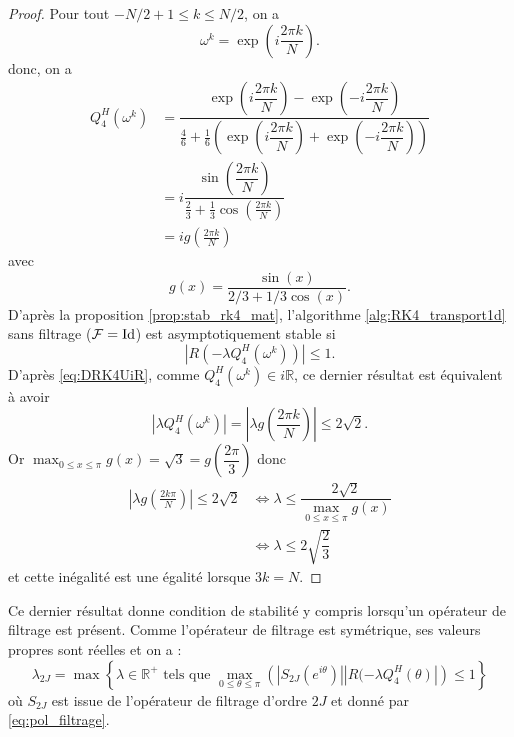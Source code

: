 \begin{proof}
Pour tout $-N/2 + 1 \leq k \leq N/2$, on a
\begin{equation}
\omega^k = \exp \left( i \dfrac{2 \pi k}{N} \right).
\end{equation}
donc, on a 
\begin{align*}
Q_4^H(\omega^k) & = \dfrac{\exp \left( i \dfrac{2 \pi k}{N} \right) - \exp \left(- i \dfrac{2 \pi k}{N} \right)}{\frac{4}{6} + \frac{1}{6} \left( \exp \left( i \dfrac{2 \pi k}{N} \right) + \exp \left( -i \dfrac{2 \pi k}{N} \right) \right)} \\
		& = i \dfrac{\sin \left( \dfrac{2 \pi k}{N} \right)}{\frac{2}{3} + \frac{1}{3} \cos \left( \frac{2 \pi k}{N} \right)}\\
		& = i g \left( \frac{2 \pi k}{N} \right)
\end{align*}
avec 
\begin{equation}
g(x) = \dfrac{\sin(x)}{2/3 + 1/3 \cos (x)}.
\end{equation}
D'après la proposition \ref{prop:stab_rk4_mat}, l'algorithme \ref{alg:RK4_transport1d} sans filtrage ($\mathcal{F} = \text{Id}$) est asymptotiquement stable si
\begin{equation}
| R(- \lambda Q_4^H(\omega^k))| \leq 1.
\end{equation}
D'après \eqref{eq:DRK4UiR}, comme $Q_4^H(\omega^k) \in i \mathbb{R}$, ce dernier résultat est équivalent à avoir 
\begin{equation}
|\lambda Q_4^H(\omega^k)| = |\lambda g \left( \frac{2\pi k}{N} \right)| \leq 2 \sqrt{2}.
\end{equation}
Or $\max_{0 \leq x \leq \pi} g(x) = \sqrt{3} = g \left(\dfrac{2 \pi}{3}\right)$ donc
\begin{align*}
| \lambda g \left( \frac{2 k \pi}{N} \right)| \leq 2 \sqrt{2} & \Leftrightarrow \lambda \leq \dfrac{2 \sqrt{2}}{\max_{0 \leq x \leq \pi} g(x)} \\
	& \Leftrightarrow \lambda \leq 2 \sqrt{\dfrac{2}{3}}
\end{align*}
et cette inégalité est une égalité lorsque $3k=N$.
\end{proof}

Ce dernier résultat donne condition de stabilité y compris lorsqu'un opérateur de filtrage est présent. Comme l'opérateur de filtrage est symétrique, ses valeurs propres sont réelles et on a :
\begin{equation}
\lambda_{2J} = \max \left\lbrace \lambda \in \mathbb{R}^+ \text{ tels que } \max_{0 \leq \theta \leq \pi} \left(|S_{2J}(e^{i \theta})| | R(-\lambda Q_4^H(\theta) | \right) \leq 1 \right\rbrace
\end{equation}
où $S_{2J}$ est issue de l'opérateur de filtrage d'ordre $2J$ et donné par \eqref{eq:pol_filtrage}.

